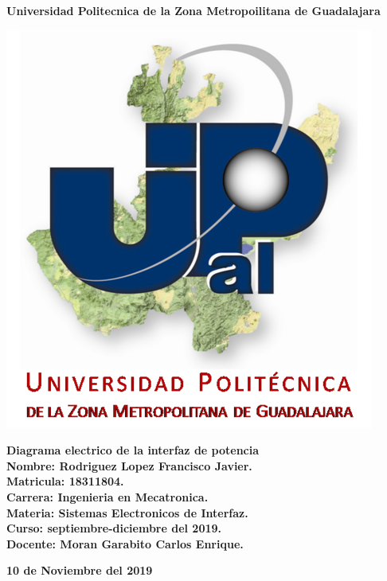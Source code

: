 \documentclass[12pt,a4paper]{article}
\author{Rodriguez Lopez Francisco Javier}
\begin{document}
\begin{center}
\LARGE \textbf{Universidad Politecnica de la Zona Metropoilitana de Guadalajara\\}


\includegraphics[scale=1]{Upzmg9.png} 

\large \textbf{Diagrama electrico de la interfaz de potencia}\\
\vspace{2cm}
\large \textbf{Nombre: Rodriguez Lopez Francisco Javier.\\
\vspace{0.5cm} Matricula: 18311804.\\
\vspace{0.5cm} Carrera: Ingenieria en Mecatronica.\\
\vspace{0.5cm} Materia: Sistemas Electronicos de Interfaz.\\
\vspace{0.5cm} Curso: septiembre-diciembre del 2019.\\
\vspace{0.5cm} Docente: Moran Garabito Carlos Enrique.}


\vspace{6cm}
\small \textbf{10 de Noviembre del 2019}
\end{center}
\end{document}
